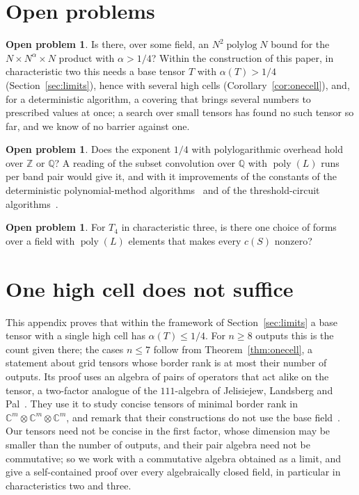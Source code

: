 \documentclass[11pt]{article}
\theoremstyle{definition}
\newtheorem{problem}[theorem]{Open problem}
\theoremstyle{remark}
\newcommand{\Z}{\mathbb{Z}}
\newcommand{\Q}{\mathbb{Q}}
\DeclareMathOperator{\polylog}{polylog}
\DeclareMathOperator{\poly}{poly}
\begin{document}
\section{Open problems}\label{sec:open}

\begin{problem}
Is there, over some field, an $N^2\polylog N$ bound for the $N\times N^\alpha\times N$ product with $\alpha>1/4$? Within the construction of this paper, in characteristic two this needs a base tensor $T$ with $\alpha(T)>1/4$ (Section~\ref{sec:limits}), hence with several high cells (Corollary~\ref{cor:onecell}), and, for a deterministic algorithm, a covering that brings several numbers to prescribed values at once; a search over small tensors has found no such tensor so far, and we know of no barrier against one.
\end{problem}

\begin{problem}
Does the exponent $1/4$ with polylogarithmic overhead hold over $\Z$ or $\Q$? A reading of the subset convolution over $\Q$ with $\poly(L)$ runs per band pair would give it, and with it improvements of the constants of the deterministic polynomial-method algorithms~\cite{CW16} and of the threshold-circuit algorithms~\cite{Wil14b,ACW16}.
\end{problem}

\begin{problem}
For $T_4$ in characteristic three, is there one choice of forms over a field with $\poly(L)$ elements that makes every $c(S)$ nonzero?
\end{problem}

\appendix
\section{One high cell does not suffice}\label{app:onecell}

This appendix proves that within the framework of Section~\ref{sec:limits} a base tensor with a single high cell has $\alpha(T)\le1/4$. For $n\ge8$ outputs this is the count given there; the cases $n\le7$ follow from Theorem~\ref{thm:onecell}, a statement about grid tensors whose border rank is at most their number of outputs. Its proof uses an algebra of pairs of operators that act alike on the tensor, a two-factor analogue of the $111$-algebra of Jelisiejew, Landsberg and Pal~\cite{JLP24}. They use it to study concise tensors of minimal border rank in $\mathbb C^m\otimes\mathbb C^m\otimes\mathbb C^m$, and remark that their constructions do not use the base field~\cite[Remark~1.13]{JLP24}. Our tensors need not be concise in the first factor, whose dimension may be smaller than the number of outputs, and their pair algebra need not be commutative; so we work with a commutative algebra obtained as a limit, and give a self-contained proof over every algebraically closed field, in particular in characteristics two and three.
\end{document}

